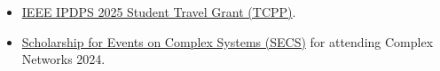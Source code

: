 \begin{itemize}[noitemsep, leftmargin=*]
  \item \href{https://www.ipdps.org/ipdps2025/2025-student-travel.html}{IEEE IPDPS 2025 Student Travel Grant (TCPP)}.
  \item \href{https://yrcss.cssociety.org/grants/secs/}{Scholarship for Events on Complex Systems (SECS)} for attending Complex Networks 2024.
\end{itemize}
